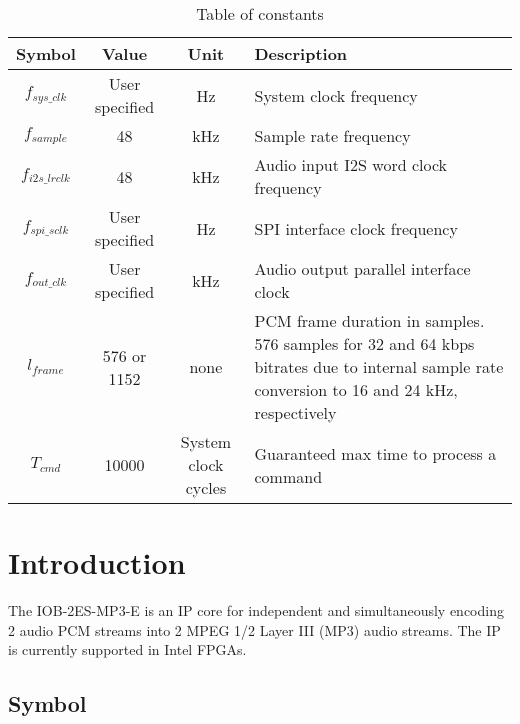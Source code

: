 \documentclass{rep}
\theoremstyle{plain}
\begin{document}
\begin{table}[H]
  \begin{center}
    \begin{tabular}{|c|c|c|p{7cm}|}
      \hline
      \rowcolor{iob-green}
      \textbf{Symbol} & \textbf{Value} & \textbf{Unit} & \textbf{Description} \\
      \hline
      \hline

      $f_{sys\_clk}$ & User specified & Hz & System clock frequency
      \\ \hline

      \rowcolor{iob-blue}
      $f_{sample}$ & 48 & kHz & Sample rate frequency \\
      \hline

      $f_{i2s\_lrclk}$ & 48 & kHz & Audio input I2S word clock
      frequency \\ \hline

      $f_{spi\_sclk}$ & User specified & Hz & SPI interface clock
      frequency\\ \hline

      \rowcolor{iob-blue} $f_{out\_clk}$ & User specified & kHz &
      Audio output parallel interface clock\\ \hline

      $l_{frame}$ & 576 or 1152 & none & PCM frame duration in
      samples. 576 samples for 32 and 64 kbps bitrates due to internal
      sample rate conversion to 16 and 24 kHz, respectively \\ \hline

      \rowcolor{iob-blue} $T_{cmd}$ & 10000 & System clock cycles &
      Guaranteed max time to process a command \\ \hline

    \end{tabular}
    \caption{Table of constants}
    \label{tab:consts}
  \end{center}
\end{table}

\clearpage

\section{Introduction}

The IOB-2ES-MP3-E is an IP core for independent and simultaneously encoding 2
audio PCM streams into 2 MPEG 1/2 Layer III (MP3) audio streams. The IP is
currently supported in Intel FPGAs.


\subsection{Symbol}
\end{document}

